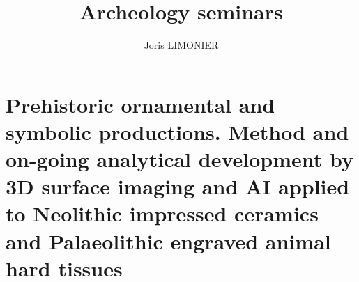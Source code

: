 \documentclass{article}
\title{Archeology seminars}
\author{Joris LIMONIER}
\begin{document}
\maketitle

\tableofcontents

\section{Prehistoric ornamental and symbolic productions. Method and on-going analytical development by 3D surface imaging and AI applied to Neolithic impressed ceramics and Palaeolithic engraved animal hard tissues}
\end{document}
